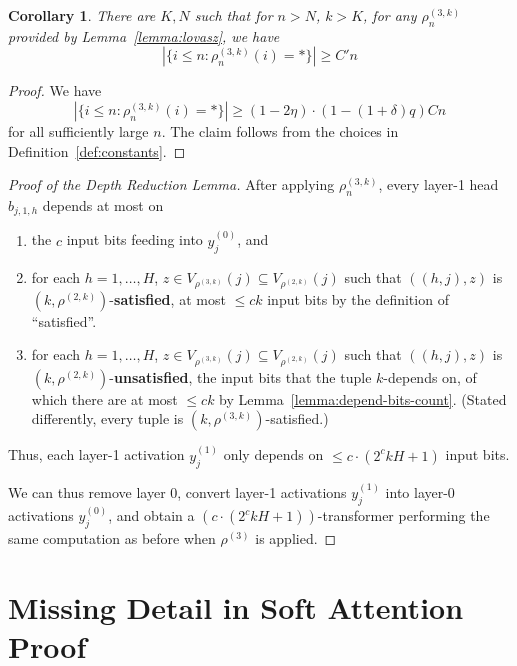 \documentclass[11pt,letterpaper]{article}
\newcounter{theorem}
\newtheorem{corollary}[theorem]{Corollary}
\begin{document}
\begin{corollary}
There are $K, N$ such that for $n > N$, $k > K$, for any $\rho^{(3,k)}_n$ provided by Lemma~\ref{lemma:lovasz}, we have 
\begin{equation*}
|\{i \leq n: \rho^{(3,k)}_n(i) = *\}|\geq C' n
\end{equation*}
\end{corollary}

\begin{proof}
We have 
\begin{equation*}
|\{i \leq n: \rho^{(3,k)}_n(i) = *\}|\geq (1-2\eta)\cdot (1-(1+\delta)q) C n
\end{equation*}
for all sufficiently large $n$.
The claim follows from the choices in Definition~\ref{def:constants}.
\end{proof}


\begin{proof}[Proof of the Depth Reduction Lemma]
After applying $\rho^{(3,k)}_n$, every layer-1 head $b_{j,1,h}$ depends at most on 
\begin{enumerate}
    \item the $c$ input bits feeding into $y_j^{(0)}$, and
    \item for each $h=1, \dots, H$, $z \in V_{\rho^{(3,k)}}(j) \subseteq V_{\rho^{(2,k)}}(j)$ such that $((h,j),z)$ is  $(k,\rho^{(2,k)})$-\textbf{satisfied}, at most $\leq ck$ input bits by the definition of ``satisfied''.
    \item for each $h=1, \dots, H$, $z \in V_{\rho^{(3,k)}}(j) \subseteq V_{\rho^{(2,k)}}(j)$ such that $((h,j),z)$ is  $(k,\rho^{(2,k)})$-\textbf{unsatisfied}, the input bits that the tuple $k$-depends on, of which there are at most $\leq ck$ by Lemma~\ref{lemma:depend-bits-count}. (Stated differently, every tuple is $(k,\rho^{(3,k)})$-satisfied.)
\end{enumerate}
Thus, each layer-1 activation $y_j^{(1)}$ only depends on $\leq c\cdot (2^ckH+1)$ input bits.

We can thus remove layer 0, convert layer-1 activations $y_j^{(1)}$ into layer-0 activations $y_j^{(0)}$, and obtain a $(c\cdot(2^ckH+1))$-transformer performing the same computation as before when $\rho^{(3)}$ is applied.
\end{proof}


\section{Missing Detail in Soft Attention Proof}
\end{document}
